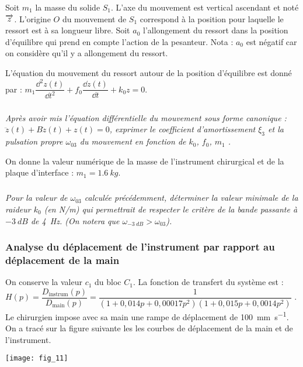 \begin{multicols}{2}
Soit $m_1$ la masse du solide $S_1$. L’axe du mouvement est vertical ascendant et noté $\overrightarrow{z}$. L’origine $O$ du mouvement de $S_1$ correspond à la position pour laquelle le ressort est à sa longueur libre.
Soit $a_0$ l’allongement du ressort dans la position d’équilibre qui prend en compte l’action de la pesanteur. 
Nota : $a_0$ est négatif car on considère qu’il y a allongement du ressort.

L'équation du mouvement du ressort autour de la position d'équilibre est donné par : $m_1\dfrac{\dd^2 z(t)}{\dd t^2} + f_0 \dfrac{\dd z (t)}{\dd t}+k_0 z = 0$.

\subparagraph{}\textit{Après avoir mis l’équation différentielle du mouvement sous forme canonique : $\ddot{z}(t)+B\dot{z}(t)+z(t)=0$, exprimer le coefficient d’amortissement $\xi_3$ et la pulsation propre $\omega_{03}$ du mouvement en fonction de $k_0$, $f_0$, $m_1$ .}
\ifprof
\begin{corrige}
\end{corrige}
\else
\fi

On donne la valeur numérique de la masse de l’instrument chirurgical et de la plaque d’interface : $m_1 = \SI{1,6}{kg}$.


\subparagraph{}\textit{Pour la valeur de $\omega_{03}$ calculée précédemment, déterminer la valeur minimale de la raideur $k_0$ (en N/m) qui permettrait de respecter le critère de la bande passante à $\SI{-3}{dB}$ de \SI{4}{Hz}.
(On notera que $ \omega_{-\SI{3}{dB}}> \omega_{03}$).
}
\ifprof
\begin{corrige}
\end{corrige}
\else
\fi

\subsubsection{Analyse du déplacement de l’instrument par rapport au déplacement de la main}

On conserve la valeur $c_1$ du bloc $C_1$. La fonction de transfert du système est : $H(p)=\dfrac{D_{\text{instrum}}(p)}{D_{\text{main}}(p)}=\dfrac{1}{\left(1+0,014p+0,00017p^2 \right)\left( 1+0,015p+0,0014p^2\right)}$ .
Le chirurgien impose avec sa main une rampe de déplacement  de \SI{100}{mm.s^{-1}}. On a tracé sur la figure suivante les les courbes de déplacement de la main et de l’instrument.


\begin{center}
\texttt{[image: fig\_11]}
\end{center}



\end{multicols}
